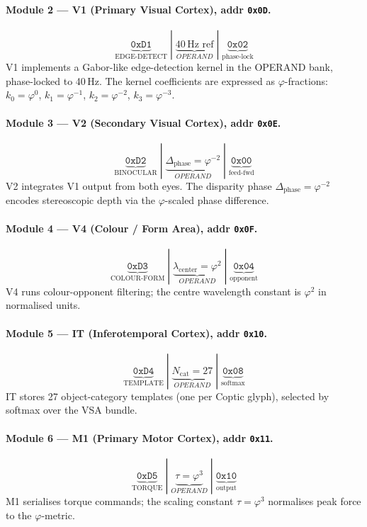 \paragraph{Module 2 — V1 (Primary Visual Cortex), addr \texttt{0x0D}.}
\[
  \underbrace{\mathtt{0xD1}}_{\text{EDGE-DETECT}}
  \;|\;
  \underbrace{40\,\text{Hz ref}}_{OPERAND}
  \;|\;
  \underbrace{\mathtt{0x02}}_{\text{phase-lock}}
\]
V1 implements a Gabor-like edge-detection kernel in the OPERAND
bank, phase-locked to 40\,Hz.
The kernel coefficients are expressed as $\varphi$-fractions:
$k_{0} = \varphi^{0}$, $k_{1} = \varphi^{-1}$,
$k_{2} = \varphi^{-2}$, $k_{3} = \varphi^{-3}$.

\paragraph{Module 3 — V2 (Secondary Visual Cortex), addr \texttt{0x0E}.}
\[
  \underbrace{\mathtt{0xD2}}_{\text{BINOCULAR}}
  \;|\;
  \underbrace{\Delta_{\text{phase}} = \varphi^{-2}}_{OPERAND}
  \;|\;
  \underbrace{\mathtt{0x00}}_{\text{feed-fwd}}
\]
V2 integrates V1 output from both eyes.
The disparity phase $\Delta_{\text{phase}} = \varphi^{-2}$
encodes stereoscopic depth via the $\varphi$-scaled phase difference.

\paragraph{Module 4 — V4 (Colour / Form Area), addr \texttt{0x0F}.}
\[
  \underbrace{\mathtt{0xD3}}_{\text{COLOUR-FORM}}
  \;|\;
  \underbrace{\lambda_{\text{center}} = \varphi^{2}}_{OPERAND}
  \;|\;
  \underbrace{\mathtt{0x04}}_{\text{opponent}}
\]
V4 runs colour-opponent filtering; the centre wavelength constant
is $\varphi^{2}$ in normalised units.

\paragraph{Module 5 — IT (Inferotemporal Cortex), addr \texttt{0x10}.}
\[
  \underbrace{\mathtt{0xD4}}_{\text{TEMPLATE}}
  \;|\;
  \underbrace{N_{\text{cat}} = 27}_{OPERAND}
  \;|\;
  \underbrace{\mathtt{0x08}}_{\text{softmax}}
\]
IT stores 27 object-category templates (one per Coptic glyph),
selected by softmax over the VSA bundle.

\paragraph{Module 6 — M1 (Primary Motor Cortex), addr \texttt{0x11}.}
\[
  \underbrace{\mathtt{0xD5}}_{\text{TORQUE}}
  \;|\;
  \underbrace{\tau = \varphi^{3}}_{OPERAND}
  \;|\;
  \underbrace{\mathtt{0x10}}_{\text{output}}
\]
M1 serialises torque commands; the scaling constant
$\tau = \varphi^{3}$ normalises peak force to the $\varphi$-metric.

